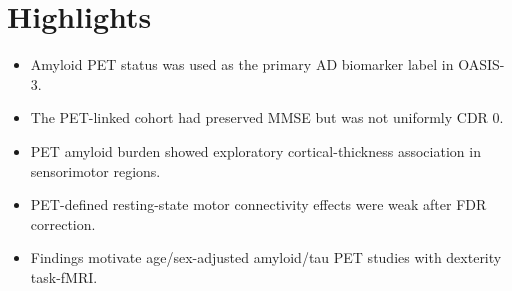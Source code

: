 \documentclass[review,3p,times]{elsarticle}
\begin{document}
\section*{Highlights}

\begin{itemize}
\item Amyloid PET status was used as the primary AD biomarker label in OASIS-3.
\item The PET-linked cohort had preserved MMSE but was not uniformly CDR 0.
\item PET amyloid burden showed exploratory cortical-thickness association in sensorimotor regions.
\item PET-defined resting-state motor connectivity effects were weak after FDR correction.
\item Findings motivate age/sex-adjusted amyloid/tau PET studies with dexterity task-fMRI.
\end{itemize}
\end{document}
